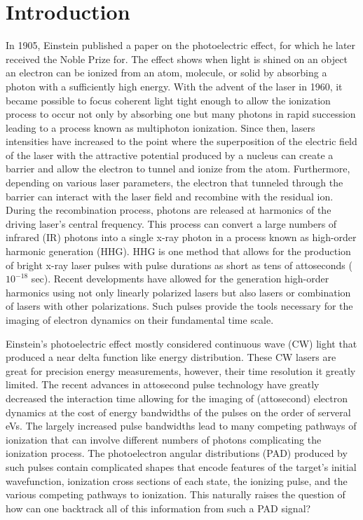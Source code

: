 \chapter{Introduction}
\label{cha:introchap}

In 1905, Einstein published a paper on the photoelectric effect, for which he later received the Noble Prize for. The effect shows when light is shined on an object an electron can be ionized from an atom, molecule, or solid by absorbing a photon with a sufficiently high energy. With the advent of the laser in 1960, it became possible to focus coherent light tight enough to allow the ionization process to occur not only by absorbing one but many photons in rapid succession leading to a process known as multiphoton ionization. Since then, lasers intensities have increased to the point where the superposition of the electric field of the laser with the attractive potential produced by a nucleus can create a barrier and allow the electron to tunnel and ionize from the atom. Furthermore, depending on various laser parameters, the electron that tunneled through the barrier can interact with the laser field and recombine with the residual ion. During the recombination process, photons are released at harmonics of the driving laser's central frequency. This process can convert a large numbers of infrared (IR) photons into a single x-ray photon in a process known as high-order harmonic generation (HHG). HHG is one method that allows for the production of bright x-ray laser pulses with pulse durations as short as tens of attoseconds ($10^{-18}$ sec). Recent developments have allowed for the generation high-order harmonics using not only linearly polarized lasers but also lasers or combination of lasers with other polarizations. Such pulses provide the tools necessary for the imaging of electron dynamics on their fundamental time scale. 

Einstein's photoelectric effect mostly considered continuous wave (CW) light that produced a near delta function like energy distribution. These CW lasers are great for precision energy measurements, however, their time resolution it greatly limited. The recent advances in attosecond pulse technology have greatly decreased the interaction time allowing for the imaging of (attosecond) electron dynamics at the cost of energy bandwidths of the pulses on the order of serveral eVs. The largely increased pulse bandwidths lead to many competing pathways of ionization that can involve different numbers of photons complicating the ionization process. The photoelectron angular distributions (PAD) produced by such pulses contain complicated shapes that encode features of the target's initial wavefunction, ionization cross sections of each state, the ionizing pulse, and the various competing pathways to ionization. This naturally raises the question of how can one backtrack all of this information from such a PAD signal?

